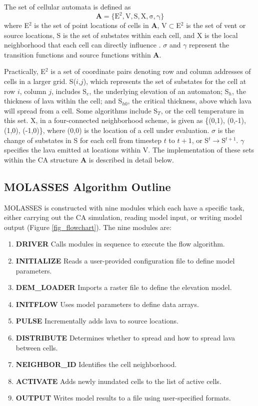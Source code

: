 \documentclass[12pt,letter]{article}
\begin{document}
The set of cellular automata is defined as
	\begin{equation}
		\mathbf{A} = \mathrm{\{E^2, V, S, X, \sigma, \gamma\}}
	\end{equation}
	where E$^2$ is the set of point locations of cells in \textbf{A}, V$\subset$E$^2$ is the set of vent or source locations, S is the set of substates within each cell, and X is the local neighborhood that each cell can directly influence \citep{barca1994cellular}. $\sigma$ and $\gamma$ represent the transition functions and source functions within \textbf{A}. 
	
	Practically, E$^2$ is a set of coordinate pairs denoting row and column addresses of cells in a larger grid. S($i$,$j$), which represents the set of substates for the cell at row $i$, column $j$, includes S$_e$, the underlying elevation of an automaton; S$_h$, the thickness of lava within the cell; and S$_{h0}$, the critical thickness, above which lava will spread from a cell. Some algorithms include S$_T$, or the cell temperature in this set. X, in a four-connected neighborhood scheme, is given as \{(0,1), (0,-1), (1,0), (-1,0)\}, where (0,0) is the location of a cell under evaluation. $\sigma$ is the change of substates in S for each cell from timestep $t$ to $t+1$, or S$^{t}\rightarrow$S$^{t+1}$. $\gamma$ specifies the lava emitted at locations within V. The implementation of these sets within the CA structure \textbf{A} is described in detail below.
	
	\subsection{MOLASSES Algorithm Outline}
		MOLASSES is constructed with nine modules which each have a specific task, either carrying out the CA simulation, reading model input, or writing model output (Figure \ref{fig_flowchart}). The nine modules are:
		\begin{enumerate}
			\item{\textbf{DRIVER}} Calls modules in sequence to execute the flow algorithm.
			\item{\textbf{INITIALIZE}} Reads a user-provided configuration file to define model parameters.
			\item{\textbf{DEM\_LOADER}} Imports a raster file to define the elevation model.
			\item{\textbf{INITFLOW}} Uses model parameters to define data arrays.
			\item{\textbf{PULSE}} Incrementally adds lava to source locations.
			\item{\textbf{DISTRIBUTE}} Determines whether to spread and how to spread lava between cells.
			\item{\textbf{NEIGHBOR\_ID}} Identifies the cell neighborhood.
			\item{\textbf{ACTIVATE}} Adds newly inundated cells to the list of active cells.
			\item{\textbf{OUTPUT}} Writes model results to a file using user-specified formats.
		\end{enumerate}
		
\end{document}
